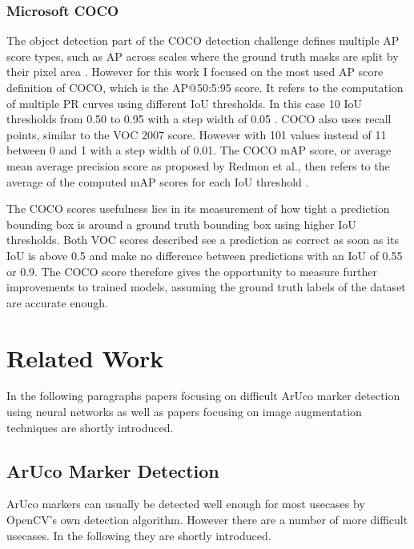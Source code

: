 \documentclass[10pt]{book}
\begin{document}
\subsection{Microsoft COCO}

The object detection part of the \ac{COCO} detection challenge defines multiple AP score types, such as AP across scales where the ground truth masks are split by their pixel area \cite{padilla2020survey}. However for this work I focused on the most used AP score definition of \ac{COCO}, which is the AP@50:5:95 score. It refers to the computation of multiple \acp{PR curve} using different \ac{IoU} thresholds. In this case 10 \ac{IoU} thresholds from 0.50 to 0.95 with a step width of 0.05 \cite{terven2023comprehensive}. \ac{COCO} also uses recall points, similar to the VOC 2007 score. However with 101 values instead of 11 between 0 and 1 with a step width of 0.01. %
The \ac{COCO} mAP score, or average mean average precision score as proposed by Redmon et al., then refers to the average of the computed mAP scores for each \ac{IoU} threshold \cite{redmon2018yolov3}. 

The \ac{COCO} scores usefulness lies in its measurement of how tight a prediction bounding box is around a ground truth bounding box using higher \ac{IoU} thresholds. Both VOC scores described see a prediction as correct as soon as its \ac{IoU} is above 0.5 and make no difference between predictions with an \ac{IoU} of 0.55 or 0.9. The \ac{COCO} score therefore gives the opportunity to measure further improvements to trained models, assuming the ground truth labels of the dataset are accurate enough.

\chapter{Related Work}
\label{chap:relatedw}

In the following paragraphs papers focusing on difficult \ac{ArUco} marker detection using neural networks as well as papers focusing on image augmentation techniques are shortly introduced.

\section{ArUco Marker Detection}

\ac{ArUco} markers can usually be detected well enough for most usecases by \ac{OpenCV}'s own detection algorithm. However there are a number of more difficult usecases. In the following they are shortly introduced.
\end{document}
